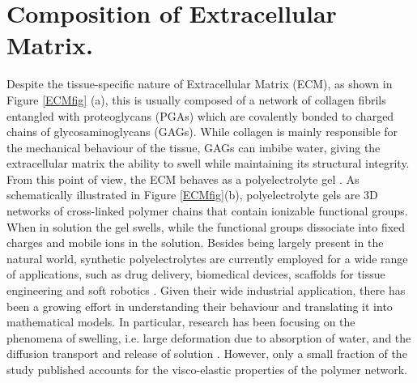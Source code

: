 \documentclass[runningheads]{llncs}
\begin{document}
\section{Composition of Extracellular Matrix.}
\label{ECMcomp}
Despite the tissue-specific nature of Extracellular Matrix (ECM), as shown in Figure \ref{ECMfig} (a), this is usually composed of a network of collagen fibrils entangled with proteoglycans (PGAs) which are covalently bonded to charged chains of glycosaminoglycans (GAGs).  While collagen is mainly responsible for the mechanical behaviour of the tissue, GAGs can imbibe water, giving the extracellular matrix the ability to swell while maintaining its structural integrity. From this point of view, the ECM behaves as a polyelectrolyte gel \cite{ecm1,ecm2}. As schematically illustrated in Figure \ref{ECMfig}(b), polyelectrolyte gels are 3D networks of cross-linked polymer chains that contain ionizable functional groups. When in solution the gel swells, while the functional groups dissociate into fixed charges and mobile ions in the solution. Besides being largely present in the natural world, synthetic polyelectrolytes are currently employed for a wide range of applications, such as drug delivery, biomedical devices, scaffolds for tissue engineering and soft robotics \cite{hydroex3,hydroex2,hydroex1,hydroex4}. Given their wide industrial application, there has been a growing effort in understanding their behaviour and translating it into mathematical models. In particular, research has been focusing on the phenomena of swelling, i.e. large deformation due to absorption of water, and the diffusion transport and release of solution  \cite{DROZDOV+,DROZDOVph,Reviewpolyel,swell2}. However, only a small fraction of the study published accounts for the visco-elastic properties of the polymer network.
\vspace{4mm}
\end{document}
